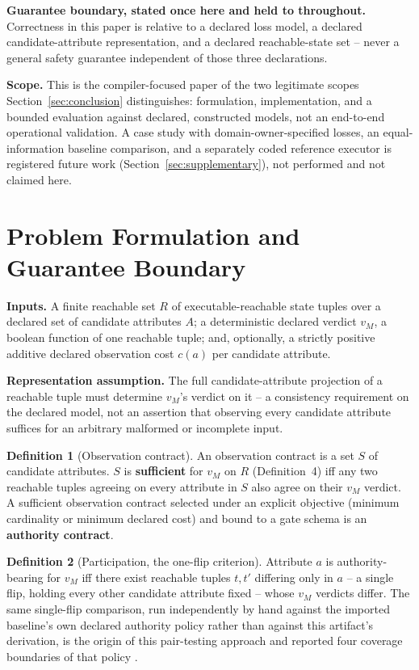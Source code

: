 \documentclass[11pt,a4paper]{article}
\theoremstyle{definition}
\newtheorem{definition}{Definition}
\begin{document}
\noindent\textbf{Guarantee boundary, stated once here and held to throughout.} Correctness in this paper is relative to a declared loss model, a declared candidate-attribute representation, and a declared reachable-state set -- never a general safety guarantee independent of those three declarations.

\noindent\textbf{Scope.} This is the compiler-focused paper of the two legitimate scopes Section~\ref{sec:conclusion} distinguishes: formulation, implementation, and a bounded evaluation against declared, constructed models, not an end-to-end operational validation. A case study with domain-owner-specified losses, an equal-information baseline comparison, and a separately coded reference executor is registered future work (Section~\ref{sec:supplementary}), not performed and not claimed here.

\section{Problem Formulation and Guarantee Boundary}
\label{sec:formal}

\noindent\textbf{Inputs.} A finite reachable set $R$ of executable-reachable state tuples over a declared set of candidate attributes $A$; a deterministic declared verdict $v_M$, a boolean function of one reachable tuple; and, optionally, a strictly positive additive declared observation cost $c(a)$ per candidate attribute.

\noindent\textbf{Representation assumption.} The full candidate-attribute projection of a reachable tuple must determine $v_M$'s verdict on it -- a consistency requirement on the declared model, not an assertion that observing every candidate attribute suffices for an arbitrary malformed or incomplete input.

\begin{definition}[Observation contract]
An observation contract is a set $S$ of candidate attributes. $S$ is \textbf{sufficient} for $v_M$ on $R$ (Definition~4) iff any two reachable tuples agreeing on every attribute in $S$ also agree on their $v_M$ verdict. A sufficient observation contract selected under an explicit objective (minimum cardinality or minimum declared cost) and bound to a gate schema is an \textbf{authority contract}.
\end{definition}

\begin{definition}[Participation, the one-flip criterion]
Attribute $a$ is authority-bearing for $v_M$ iff there exist reachable tuples $t, t'$ differing only in $a$ -- a single flip, holding every other candidate attribute fixed -- whose $v_M$ verdicts differ. The same single-flip comparison, run independently by hand against the imported baseline's own declared authority policy rather than against this artifact's derivation, is the origin of this pair-testing approach and reported four coverage boundaries of that policy \cite{moona-intelligence-replication}.
\end{definition}
\end{document}
